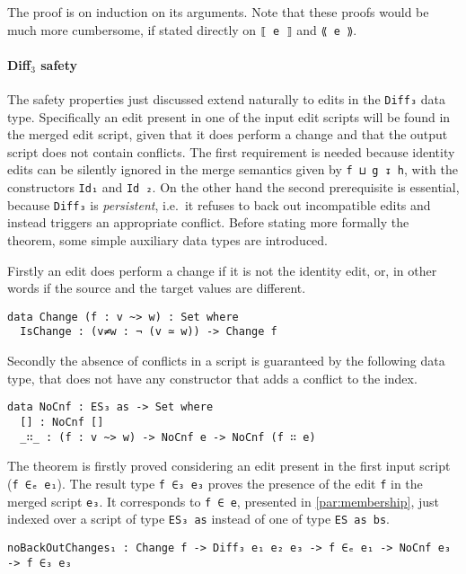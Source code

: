 \documentclass[../Thesis.tex]{subfiles}
\begin{document}
	The proof is on induction on its arguments. Note that these proofs
	would be much more cumbersome, if stated directly 
	on \texttt{⟦ e ⟧} and \texttt{⟪ e ⟫}.
	
	\paragraph{Diff$_3$ safety}
	\label{par:diff3-safety}
	The safety properties just discussed extend naturally to edits in the 
	\texttt{Diff₃} data type. Specifically an edit present in one of the input
	edit scripts will be found in the merged edit script, given that it does
	perform a change and that the output script does not contain conflicts.
	The first requirement is needed because identity edits can be silently 
	ignored in the merge semantics given by \texttt{f ⊔ g ↧ h}, with the
	constructors \texttt{Id₁} and \texttt{Id	₂}.
	On the other hand the second prerequisite is essential, because 
	\texttt{Diff₃} is \emph{persistent},
	i.e.\ it refuses to back out incompatible edits and instead triggers 
	an appropriate conflict.
	Before stating more formally the theorem, some simple auxiliary 
	data	types are introduced.

	Firstly an edit does perform a change if it is not the identity edit, or, in 
	other words	if the source and the target values are different.

\begin{verbatim}
data Change (f : v ~> w) : Set where
  IsChange : (v≠w : ¬ (v ≃ w)) -> Change f
\end{verbatim}

	Secondly the absence of conflicts in a script is guaranteed by 
	the following data type, that does not have any constructor that adds
	a conflict to the index.

\begin{verbatim}	
data NoCnf : ES₃ as -> Set where
  [] : NoCnf []
  _∷_ : (f : v ~> w) -> NoCnf e -> NoCnf (f ∷ e)
\end{verbatim}
			
	The theorem is firstly proved considering an edit present in
	the first input script (\texttt{f ∈ₑ e₁}).
	The result type \texttt{f ∈₃ e₃} proves the presence of the edit \texttt{f}
	in the merged script \texttt{e₃}. 
	It corresponds to \texttt{f ∈ e}, presented in 
	\ref{par:membership}, just indexed over a script of type \texttt{ES₃ as}
	instead of one of 	type \texttt{ES as bs}.
	
\begin{verbatim}
noBackOutChanges₁ : Change f -> Diff₃ e₁ e₂ e₃ -> f ∈ₑ e₁ -> NoCnf e₃ -> f ∈₃ e₃
\end{verbatim}
\end{document}

